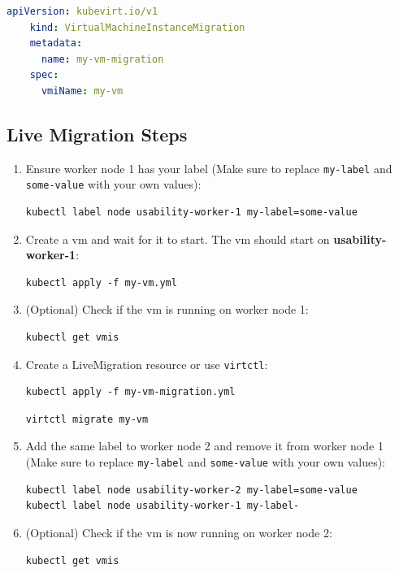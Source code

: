 \documentclass{kththesis}
\begin{document}
\begin{enumerate}
\begin{lstlisting}[language=yaml]
    apiVersion: kubevirt.io/v1
    kind: VirtualMachineInstanceMigration
    metadata:
      name: my-vm-migration
    spec:
      vmiName: my-vm
\end{lstlisting}

\subsection*{Live Migration Steps}
\begin{enumerate}
    \item Ensure worker node 1 has your label (Make sure to replace \texttt{my-label} and \texttt{some-value} with your own values):
\begin{lstlisting}
kubectl label node usability-worker-1 my-label=some-value
\end{lstlisting}

    \item Create a \Gls{vm} and wait for it to start. The \Gls{vm} should start on \textbf{usability-worker-1}:
\begin{lstlisting}
kubectl apply -f my-vm.yml
\end{lstlisting}

    \item (Optional) Check if the \Gls{vm} is running on worker node 1:
\begin{lstlisting}
kubectl get vmis
\end{lstlisting}

    \item Create a LiveMigration resource or use \texttt{virtctl}:
\begin{lstlisting}
kubectl apply -f my-vm-migration.yml
\end{lstlisting}
\begin{lstlisting}
virtctl migrate my-vm
\end{lstlisting}

    \item Add the same label to worker node 2 and remove it from worker node 1 (Make sure to replace \texttt{my-label} and \texttt{some-value} with your own values):
\begin{lstlisting}
kubectl label node usability-worker-2 my-label=some-value
kubectl label node usability-worker-1 my-label-
\end{lstlisting}

    \item (Optional) Check if the \Gls{vm} is now running on worker node 2:
\begin{lstlisting}
kubectl get vmis
\end{lstlisting}


\end{enumerate}
\end{enumerate}
\end{document}
